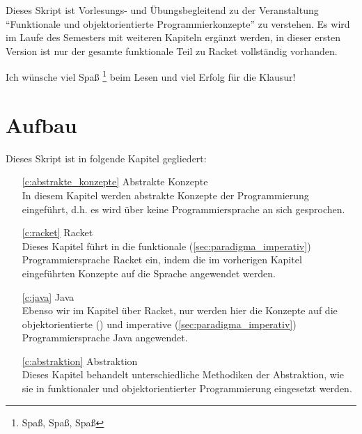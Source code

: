 Dieses Skript ist Vorlesungs- und Übungsbegleitend zu der Veranstaltung \enquote{Funktionale und objektorientierte Programmierkonzepte} zu verstehen. Es wird im Laufe des Semesters mit weiteren Kapiteln ergänzt werden, in dieser ersten Version ist nur der gesamte funktionale Teil zu Racket vollständig vorhanden.

Ich wünsche viel Spaß \footnote{Spaß, Spaß, Spaß} beim Lesen und viel Erfolg für die Klausur!

\section{Aufbau}
	Dieses Skript ist in folgende Kapitel gegliedert:
	\begin{itemize}
		\item[\ref{c:abstrakte_konzepte}] Abstrakte Konzepte \\ In diesem Kapitel werden abstrakte Konzepte der Programmierung eingeführt, d.h. es wird über keine Programmiersprache an sich gesprochen.
		\item[\ref{c:racket}] Racket \\ Dieses Kapitel führt in die funktionale (\ref{sec:paradigma_imperativ}) Programmiersprache Racket ein, indem die im vorherigen Kapitel eingeführten Konzepte auf die Sprache angewendet werden.
		\item[\ref{c:java}] Java \\ Ebenso wir im Kapitel über Racket, nur werden hier die Konzepte auf die objektorientierte () und imperative (\ref{sec:paradigma_imperativ}) Programmiersprache Java angewendet.
		\item[\ref{c:abstraktion}] Abstraktion \\ Dieses Kapitel behandelt unterschiedliche Methodiken der Abstraktion, wie sie in funktionaler und objektorientierter Programmierung eingesetzt werden.
	\end{itemize}

